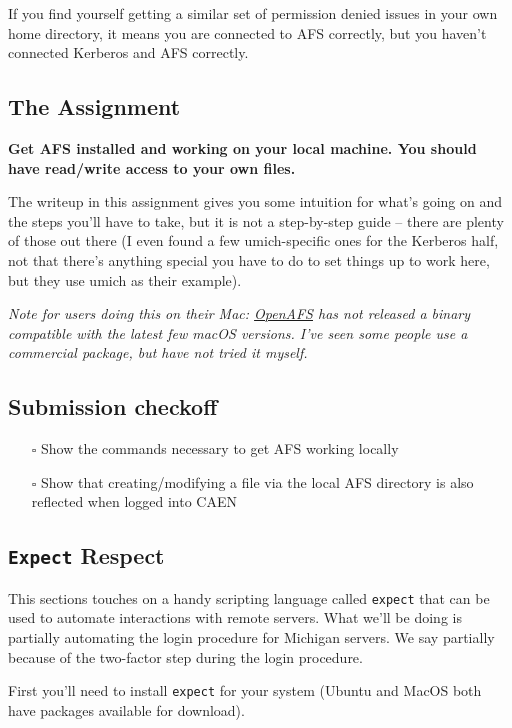\documentclass{article}
\begin{document}
If you find yourself getting a similar set of permission denied issues in your
own home directory, it means you are connected to AFS correctly, but you
haven't connected Kerberos and AFS correctly.


\subsection*{The Assignment}

\textbf{Get AFS installed and working on your local machine. You should have
read/write access to your own files.}

The writeup in this assignment gives you some intuition for what's going on
and the steps you'll have to take, but it is not a step-by-step guide -- there
are plenty of those out there (I even found a few umich-specific ones for the
Kerberos half, not that there's anything special you have to do to set things
up to work here, but they use umich as their example).

\emph{Note for users doing this on their Mac:
\href{https://www.openafs.org/}{OpenAFS} has not released a binary compatible
with the latest few macOS versions. I've seen some people use a commercial
package, but have not tried it myself.}

\subsection*{Submission checkoff}
\begin{itemize}
  \item[$\square$] Show the commands necessary to get AFS working locally
  \item[$\square$] Show that creating/modifying a file via the local AFS directory
      is also reflected when logged into CAEN
\end{itemize}


\subsection*{\texttt{Expect} Respect}

This sections touches on a handy scripting language called \texttt{expect} that
can be used to automate interactions with remote servers. What we'll be doing is
partially automating the login procedure for Michigan servers. We say partially
because of the two-factor step during the login procedure.

First you'll need to install \texttt{expect} for your system (Ubuntu and MacOS
both have packages available for download).
\end{document}
